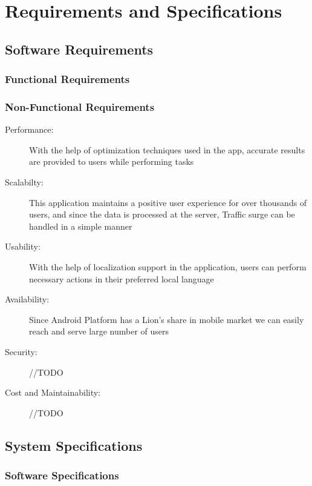 \documentclass[../Report.tex]{subfiles}
\begin{document}
\chapter{Requirements and  Specifications}

\section{Software Requirements}

\subsection{Functional Requirements}

\subsection{Non-Functional Requirements}
\begin{description}
  \item[Performance: ] With the help of optimization techniques used in the app, accurate results are provided to users while performing tasks
  
  \item[Scalabilty: ] This application maintains a positive user experience for over thousands of users, and since the data is processed
at the server, Traffic surge can be handled in a simple manner

  \item[Usability: ] With the help of localization support in the application, users can perform necessary actions in their preferred local language

  \item[Availability: ] Since Android Platform has a Lion's share in mobile market we can easily reach and serve large number of users

  \item[Security: ] //TODO

  \item[Cost and Maintainability: ] //TODO
\end{description} 

\section{System Specifications}

\subsection{Software Specifications}
\end{document}
